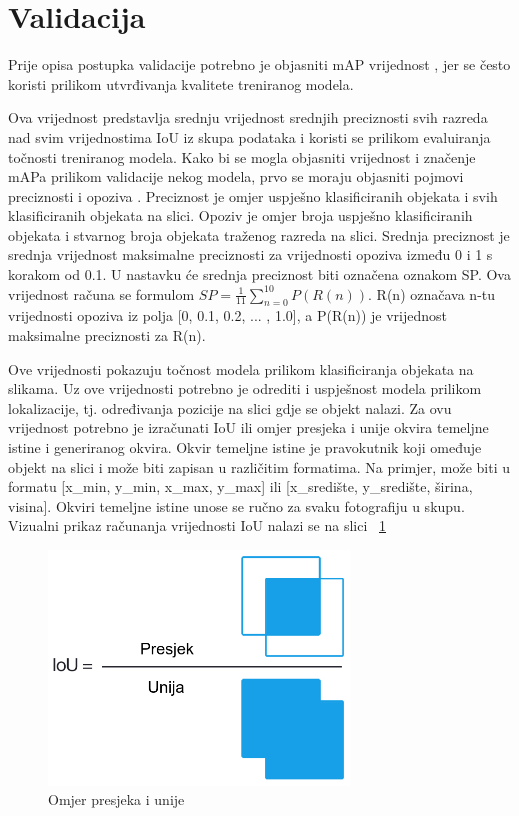 \section{Validacija} \label{Validacija}

Prije opisa postupka validacije potrebno je objasniti mAP vrijednost , jer se često koristi prilikom utvrđivanja 
kvalitete treniranog modela.

Ova vrijednost predstavlja srednju vrijednost srednjih preciznosti svih razreda nad svim
vrijednostima IoU iz skupa podataka i koristi se prilikom evaluiranja točnosti treniranog modela. 
Kako bi se mogla objasniti vrijednost i značenje mAPa prilikom validacije nekog modela, prvo se moraju objasniti pojmovi
preciznosti  i opoziva . Preciznost je omjer uspješno klasificiranih objekata i svih klasificiranih objekata na slici. 
Opoziv je omjer broja uspješno klasificiranih objekata i stvarnog broja objekata traženog razreda na slici. 
Srednja preciznost  je srednja vrijednost maksimalne preciznosti za vrijednosti opoziva između 0 i 1 s korakom 
od 0.1. U nastavku će srednja preciznost biti označena oznakom SP. \newline 
Ova vrijednost računa se formulom  $SP=\frac{1}{11}\sum_{n=0}^{10} P(R(n))$. R(n) označava n-tu vrijednosti opoziva iz polja [0, 0.1, 0.2, ... , 1.0], a 
P(R(n)) je vrijednost maksimalne preciznosti za R(n). \citep{everingham2010pascal}

Ove vrijednosti pokazuju točnost modela prilikom klasificiranja objekata na slikama. Uz ove vrijednosti potrebno je odrediti i uspješnost modela prilikom lokalizacije, tj. 
određivanja pozicije na slici gdje se objekt nalazi. Za ovu vrijednost potrebno je izračunati IoU  ili omjer presjeka i unije okvira temeljne istine i 
generiranog okvira. Okvir temeljne istine je pravokutnik koji omeđuje objekt na slici i može biti zapisan u različitim formatima. Na primjer, može biti u formatu 
[x\_min, y\_min, x\_max, y\_max] ili [x\_središte, y\_središte, širina, visina]. Okviri temeljne istine unose se ručno za svaku fotografiju u skupu.
Vizualni prikaz računanja vrijednosti IoU nalazi se na slici ~\ref{IoU}

\begin{figure}[htb]
    \centering
    \includegraphics[width=8cm]{img/iou_equation.png}
    \caption{Omjer presjeka i unije}
    \label{IoU}
\end{figure}

